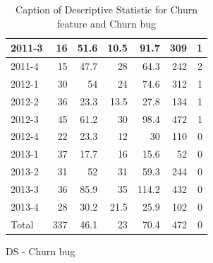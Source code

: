 \documentclass[UKenglish]{ifimaster}  %
\begin{document}
\begin{appendices}
\begin{table}[!htbp]
\begin{adjustwidth}{-2.5cm}{}
\begin{subfigure}[b]{0.3\textwidth}
{\begin{tabular}{ | l | r | r | r | r | r | r | }
 2011-3  & 16 & 51.6 & 10.5 & 91.7 & 309 & 1 \\ \hline
 2011-4  & 15 & 47.7 & 28 & 64.3 & 242 & 2 \\ \hline
 2012-1  & 30 & 54 & 24 & 74.6 & 312 & 1 \\ \hline
 2012-2  & 36 & 23.3 & 13.5 & 27.8 & 134 & 1 \\ \hline
 2012-3  & 45 & 61.2 & 30 & 98.4 & 472 & 1 \\ \hline
 2012-4  & 22 & 23.3 & 12 & 30 & 110 & 0\\ \hline
 2013-1  & 37 & 17.7 & 16 & 15.6 & 52 & 0\\ \hline
 2013-2  & 31 & 52 & 31 & 59.3 & 244 & 0\\ \hline
 2013-3  & 36 & 85.9 & 35 & 114.2 & 432 & 0\\ \hline
 2013-4  & 28 & 30.2 & 21.5 & 25.9 & 102 & 0\\ \hline
 Total  & 337 & 46.1 & 23 & 70.4 & 472 & 0\\ \hline

\end{tabular}
}
\caption{DS - Churn bug}
 \label{DS:CB:9}
\end{subfigure}
\end{adjustwidth}
\caption[Optional caption for list of figures]{Caption of Descriptive Statistic for Churn feature and Churn bug}
\label{DS:9:4} %
\end{table}




\end{appendices}
\end{document}
